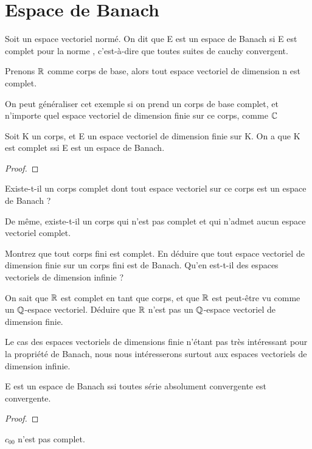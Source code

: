 \chapter{Espace de Banach}

\begin{definition} 
	Soit  un espace vectoriel normé. On dit que E
	est un espace de Banach si E est complet pour la norme ,
	c'est-à-dire que toutes suites de cauchy convergent.
\end{definition}

Prenons $\mathbb{R}$ comme corps de base, alors tout espace vectoriel de dimension n
est complet.

On peut généraliser cet exemple si on prend un corps de base complet, et
n'importe quel espace vectoriel de dimension finie sur ce corps, comme $\mathbb{C}$

\begin{proposition}
	Soit K un corps, et E un espace vectoriel de dimension finie sur K. On a que
	K est complet ssi E est un espace de Banach.
\end{proposition}

\begin{proof}
	
\end{proof}

\begin{question}
	Existe-t-il un corps complet dont tout espace vectoriel sur ce corps est un
	espace de Banach ?

	De même, existe-t-il un corps qui n'est pas complet et qui n'admet aucun
	espace vectoriel complet.
\end{question}

\begin{exercice}
	Montrez que tout corps fini est complet. En déduire que tout espace
	vectoriel de dimension finie sur un corps fini est de Banach. Qu'en est-t-il
	des espaces vectoriels de dimension infinie ?
\end{exercice}

\begin{exercice}
	On sait que $\mathbb{R}$ est complet en tant que corps, et que $\mathbb{R}$ est
	peut-être vu comme un $\mathbb{Q}$-espace vectoriel. Déduire que $\mathbb{R}$
	n'est pas un $\mathbb{Q}$-espace vectoriel de dimension finie.
\end{exercice}

Le cas des espaces vectoriels de dimensions finie n'étant pas très intéressant
pour la propriété de Banach, nous nous intéresserons surtout aux espaces
vectoriels de dimension infinie.

\begin{proposition}
	E est un espace de Banach ssi toutes série absolument convergente
	est convergente.
\end{proposition}

\begin{proof}
	
\end{proof}

\begin{exemple}
	$c_{00}$ n'est pas complet.
\end{exemple}
